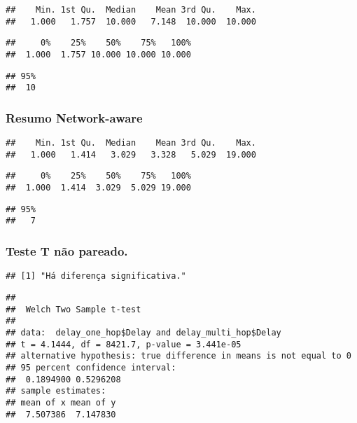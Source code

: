 \documentclass[
]{article}
\begin{document}
\begin{verbatim}
##    Min. 1st Qu.  Median    Mean 3rd Qu.    Max. 
##   1.000   1.757  10.000   7.148  10.000  10.000
\end{verbatim}

\begin{verbatim}
##     0%    25%    50%    75%   100% 
##  1.000  1.757 10.000 10.000 10.000
\end{verbatim}

\begin{verbatim}
## 95% 
##  10
\end{verbatim}

\hypertarget{resumo-network-aware}{%
\subsubsection{Resumo Network-aware}\label{resumo-network-aware}}

\begin{verbatim}
##    Min. 1st Qu.  Median    Mean 3rd Qu.    Max. 
##   1.000   1.414   3.029   3.328   5.029  19.000
\end{verbatim}

\begin{verbatim}
##     0%    25%    50%    75%   100% 
##  1.000  1.414  3.029  5.029 19.000
\end{verbatim}

\begin{verbatim}
## 95% 
##   7
\end{verbatim}

\hypertarget{teste-t-nuxe3o-pareado.}{%
\subsubsection{Teste T não pareado.}\label{teste-t-nuxe3o-pareado.}}

\begin{verbatim}
## [1] "Há diferença significativa."
\end{verbatim}

\begin{verbatim}
## 
##  Welch Two Sample t-test
## 
## data:  delay_one_hop$Delay and delay_multi_hop$Delay
## t = 4.1444, df = 8421.7, p-value = 3.441e-05
## alternative hypothesis: true difference in means is not equal to 0
## 95 percent confidence interval:
##  0.1894900 0.5296208
## sample estimates:
## mean of x mean of y 
##  7.507386  7.147830
\end{verbatim}
\end{document}
